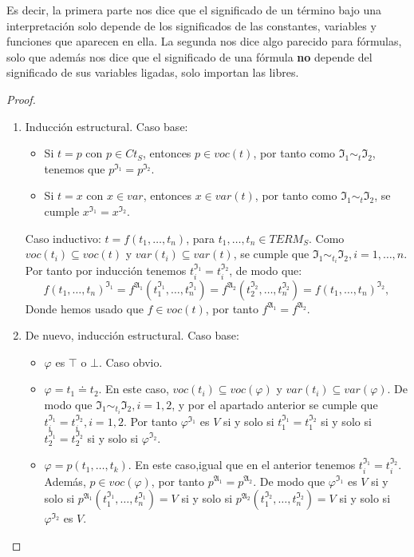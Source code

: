 Es decir, la primera parte nos dice que el significado de un término bajo una interpretación solo depende de los significados de las constantes, variables y funciones que aparecen en ella. La segunda nos dice algo parecido para fórmulas, solo que además nos dice que el significado de una fórmula \textbf{no} depende del significado de sus variables ligadas, solo importan las libres.
\begin{proof}\mbox{}
\begin{enumerate}
    \item Inducción estructural.
    Caso base:
    \begin{itemize}
        \item Si $t=p$ con $p\in Ct_S$, entonces $p\in voc(t)$, por tanto como $\mathfrak{I}_{1} \sim_{t} \mathfrak{I}_{2}$, tenemos que $p^{\mathfrak{I}_1}=p^{\mathfrak{I}_2}$.
        \item Si $t=x$ con $x\in var$, entonces $x\in var(t)$, por tanto como $\mathfrak{I}_{1} \sim_{t} \mathfrak{I}_{2}$, se cumple $x^{\mathfrak{I}_1}=x^{\mathfrak{I}_2}$.
    \end{itemize} 
    Caso inductivo: $t=f(t_1,\dots,t_n)$, para $t_1,\dots,t_n\in TERM_S.$ Como $voc(t_i)\subseteq voc(t)$ y $var(t_i)\subseteq var(t)$, se cumple que $\mathfrak{I}_{1} \sim_{t_i} \mathfrak{I}_{2}, i=1,\dots,n$.\\
    Por tanto por inducción tenemos $t_i^{\mathfrak{I}_1}=t_i^{\mathfrak{I}_2}$, de modo que:
    $$f(t_1,\dots,t_n)^{\mathfrak{I}_1}=f^{\mathfrak{A}_1}(t_1^{\mathfrak{I}_1},\dots,t_n^{\mathfrak{I}_1})=f^{\mathfrak{A}_2}(t_2^{\mathfrak{I}_2},\dots,t_n^{\mathfrak{I}_2})=f(t_1,\dots,t_n)^{\mathfrak{I}_2},$$
    Donde hemos usado que $f\in voc(t)$, por tanto $f^{\mathfrak{A}_1}=f^{\mathfrak{A}_2}$.
    \item De nuevo, inducción estructural.
    Caso base:
    \begin{itemize}
        \item $\varphi$ es $\top$ o $\bot$. Caso obvio.
        \item $\varphi=t_1\doteq t_2$. En este caso, $voc(t_i)\subseteq voc(\varphi)$ y $var(t_i)\subseteq var(\varphi)$. De modo que $\mathfrak{I}_{1} \sim_{t_i} \mathfrak{I}_{2}, i=1,2$, y por el apartado anterior se cumple que $t_i^{\mathfrak{I}_{1}} = t_i^{\mathfrak{I}_{2}},i=1,2$. Por tanto $\varphi^{\mathfrak{I}_1}$ es $V$ si y solo si $t_1^{\mathfrak{I}_{1}} = t_1^{\mathfrak{I}_{2}}$ si y solo si $t_2^{\mathfrak{I}_{1}} = t_2^{\mathfrak{I}_{2}}$ si y solo si $\varphi^{\mathfrak{I}_2}$.
        \item $\varphi=p(t_1,\dots,t_k)$. En este caso,igual que en el anterior tenemos $t_i^{\mathfrak{I}_1}=t_i^{\mathfrak{I}_2}$. Además, $p\in voc(\varphi)$, por tanto $p^{\mathfrak{A}_1}=p^{\mathfrak{A}_2}$. De modo que $\varphi^{\mathfrak{I}_1}$ es $V$ si y solo si $p^{\mathfrak{A}_1}(t_1^{\mathfrak{I}_1},\dots,t_n^{\mathfrak{I}_1})=V$ si y solo si $p^{\mathfrak{A}_2}(t_1^{\mathfrak{I}_2},\dots,t_n^{\mathfrak{I}_2})=V$ si y solo si $\varphi^{\mathfrak{I}_2}$ es $V$.

\end{itemize}
\end{enumerate}
\end{proof}
